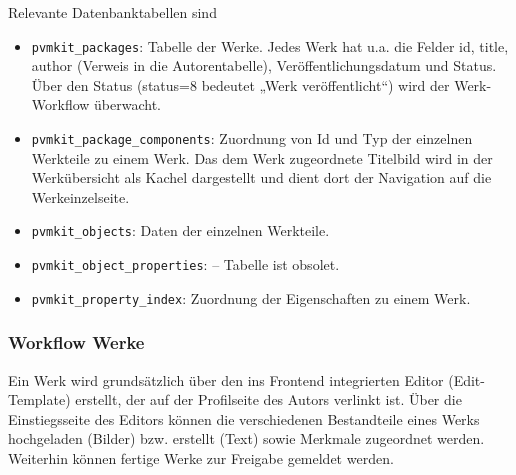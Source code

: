 \documentclass[a4paper,11pt]{article}
\begin{document}
Relevante Datenbanktabellen sind    
\begin{itemize}\itemsep0pt
\item \texttt{pvmkit\_packages}: Tabelle der Werke. Jedes Werk hat u.a. die
  Felder id, title, author (Verweis in die Autorentabelle),
  Veröffentlichungsdatum und Status.  Über den Status (status=8 bedeutet „Werk
  veröffentlicht“) wird der Werk-Workflow überwacht.  
\item \texttt{pvmkit\_package\_components}: Zuordnung von Id und Typ der
  einzelnen Werkteile zu einem Werk. Das dem Werk zugeordnete Titelbild wird in
  der Werkübersicht als Kachel dargestellt und dient dort der Navigation auf
  die Werkeinzelseite.
\item \texttt{pvmkit\_objects}: Daten der einzelnen Werkteile.               
\item \texttt{pvmkit\_object\_properties}: -- Tabelle ist obsolet.
\item \texttt{pvmkit\_property\_index}: Zuordnung der Eigenschaften zu einem
  Werk.    
\end{itemize}

\subsubsection*{Workflow Werke}

Ein Werk wird grundsätzlich über den ins Frontend integrierten Editor
(Edit-Template) erstellt, der auf der Profilseite des Autors verlinkt ist.
Über die Einstiegsseite des Editors können die verschiedenen Bestandteile
eines Werks hochgeladen (Bilder) bzw. erstellt (Text) sowie Merkmale
zugeordnet werden.  Weiterhin können fertige Werke zur Freigabe gemeldet
werden. 
\end{document}
